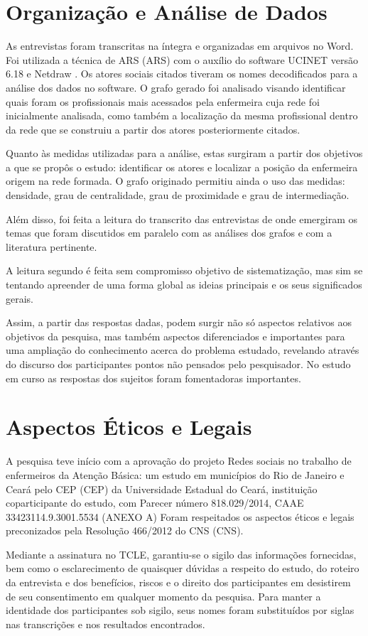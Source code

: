 \section{Organização e Análise de Dados}
As entrevistas foram transcritas na íntegra e organizadas em arquivos no Word. Foi utilizada a técnica de \acrlong{ARS} (\acrshort{ARS}) com o auxílio do software UCINET versão 6.18 e Netdraw \cite{ucinet}. Os atores sociais citados tiveram os nomes decodificados para a análise dos dados no software. O grafo gerado foi analisado visando identificar quais foram os profissionais mais acessados pela enfermeira cuja rede foi inicialmente analisada, como também a localização da mesma profissional dentro da rede que se construiu a partir dos atores posteriormente citados.

Quanto às medidas utilizadas para a análise, estas surgiram a partir dos objetivos a que se propôs o estudo: identificar os atores e localizar a posição da enfermeira origem na rede formada. O grafo originado permitiu ainda o uso das medidas: densidade, 
grau de centralidade, grau de proximidade e grau de intermediação.

Além disso, foi feita a leitura do transcrito das entrevistas de onde emergiram os temas que foram discutidos em paralelo com as análises dos grafos e com a literatura pertinente. 

A leitura segundo  é feita sem compromisso objetivo de sistematização, mas sim se tentando apreender de uma forma global as ideias principais e os seus significados gerais.  

Assim, a partir das respostas dadas, podem surgir não só aspectos relativos aos objetivos da pesquisa, mas também aspectos diferenciados e importantes para uma ampliação do conhecimento acerca do problema estudado, revelando através do discurso dos participantes pontos não pensados pelo pesquisador. No estudo em curso as respostas dos sujeitos foram fomentadoras importantes.

\section{Aspectos Éticos e Legais}
A pesquisa teve início com a aprovação do projeto Redes sociais no trabalho de enfermeiros da Atenção Básica: um estudo em municípios do Rio de Janeiro e Ceará pelo \acrlong{CEP} (\acrshort{CEP}) da Universidade Estadual do Ceará, instituição coparticipante do estudo, com Parecer número 818.029/2014, CAAE 33423114.9.3001.5534 (ANEXO A)  Foram respeitados os aspectos éticos e legais preconizados pela Resolução 466/2012 do \acrlong{CNS} (\acrshort{CNS}). 

Mediante a assinatura no \acrshort{TCLE}, garantiu-se o sigilo das informações fornecidas, bem como o esclarecimento de quaisquer dúvidas a respeito do estudo, do roteiro da entrevista e dos benefícios, riscos e o direito dos participantes em desistirem de seu consentimento em qualquer momento da pesquisa. Para manter a identidade dos participantes sob sigilo, seus nomes foram substituídos por siglas nas transcrições e nos resultados encontrados.
